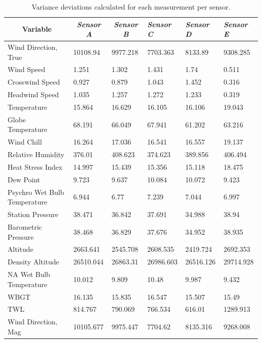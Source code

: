 \documentclass[a4paper,12pt]{article} %
\begin{document}
\begin{enumerate}
\begin{table}[H]
\centering
\caption{Variance deviations calculated for each measurement per sensor.}
\begin{tabular}{llllll}
\multicolumn{1}{c}{\textbf{Variable}} & \multicolumn{1}{c}{\textit{Sensor A}} & \multicolumn{1}{c}{\textit{Sensor B}} & \textit{Sensor C} & \textit{Sensor D} & \textit{Sensor E}  \\ \hline
Wind Direction‚ True             & 10108.94  & 9977.218  & 7703.363  & 8133.89   & 9308.285  \\
Wind Speed                   & 1.251     & 1.302     & 1.431     & 1.74      & 0.511     \\
Crosswind Speed              & 0.927     & 0.879     & 1.043     & 1.452     & 0.316     \\
Headwind Speed               & 1.035     & 1.257     & 1.272     & 1.233     & 0.319     \\
Temperature                  & 15.864    & 16.629    & 16.105    & 16.106    & 19.043    \\
Globe Temperature            & 68.191    & 66.049    & 67.941    & 61.202    & 63.216    \\
Wind Chill                   & 16.264    & 17.036    & 16.541    & 16.557    & 19.137    \\
Relative Humidity            & 376.01    & 408.623   & 374.623   & 389.856   & 406.494   \\
Heat Stress Index            & 14.997    & 15.439    & 15.356    & 15.118    & 18.475    \\
Dew Point                    & 9.723     & 9.637     & 10.084    & 10.072    & 9.423     \\
Psychro Wet Bulb Temperature & 6.944     & 6.77      & 7.239     & 7.044     & 6.997     \\
Station Pressure             & 38.471    & 36.842    & 37.691    & 34.988    & 38.94     \\
Barometric Pressure          & 38.468    & 36.829    & 37.676    & 34.952    & 38.935    \\
Altitude                     & 2663.641  & 2545.708  & 2608.535  & 2419.724  & 2692.353  \\
Density Altitude             & 26510.044 & 26863.31  & 26986.603 & 26516.126 & 29714.928 \\
NA Wet Bulb Temperature      & 10.012    & 9.809     & 10.48     & 9.987     & 9.432     \\
WBGT                         & 16.135    & 15.835    & 16.547    & 15.507    & 15.49     \\
TWL                          & 814.767   & 790.069   & 766.534   & 616.01    & 1289.913  \\
Wind Direction‚ Mag              & 10105.677 & 9975.447  & 7704.62   & 8135.316  & 9268.008 
\end{tabular}
\label{var-table}
\end{table}


\end{enumerate}
\end{document}
